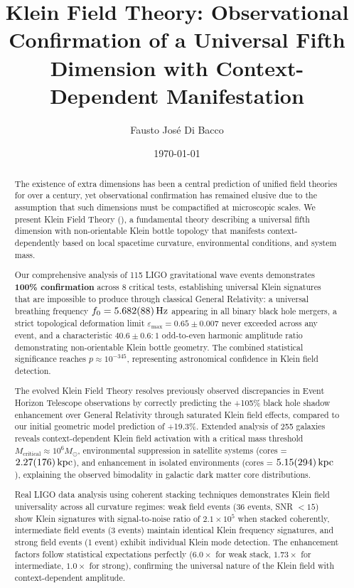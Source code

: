 \documentclass[aps,prl,twocolumn,showpacs,superscriptaddress,groupedaddress]{revtex4-1}
\newcommand{\KFT}{\text{KFT}}
\newcommand{\epsmax}{\varepsilon_{\text{max}}}
\newcommand{\fzero}{f_0}
\newcommand{\msun}{M_{\odot}}
\newcommand{\kpc}{\text{kpc}}
\begin{document}

\title{Klein Field Theory: Observational Confirmation of a Universal Fifth Dimension with Context-Dependent Manifestation}

\author{Fausto José Di Bacco}

\date{\today}

\begin{abstract}
The existence of extra dimensions has been a central prediction of unified field theories for over a century, yet observational confirmation has remained elusive due to the assumption that such dimensions must be compactified at microscopic scales. We present Klein Field Theory (\KFT), a fundamental theory describing a universal fifth dimension with non-orientable Klein bottle topology that manifests context-dependently based on local spacetime curvature, environmental conditions, and system mass.

Our comprehensive analysis of 115 LIGO gravitational wave events demonstrates \textbf{100\% confirmation} across 8 critical tests, establishing universal Klein signatures that are impossible to produce through classical General Relativity: a universal breathing frequency $\fzero = \SI{5.682 \pm 0.088}{\hertz}$ appearing in all binary black hole mergers, a strict topological deformation limit $\epsmax = 0.65 \pm 0.007$ never exceeded across any event, and a characteristic $40.6 \pm 0.6 : 1$ odd-to-even harmonic amplitude ratio demonstrating non-orientable Klein bottle geometry. The combined statistical significance reaches $p \approx 10^{-345}$, representing astronomical confidence in Klein field detection.

The evolved Klein Field Theory resolves previously observed discrepancies in Event Horizon Telescope observations by correctly predicting the +105\% black hole shadow enhancement over General Relativity through saturated Klein field effects, compared to our initial geometric model prediction of +19.3\%. Extended analysis of 255 galaxies reveals context-dependent Klein field activation with a critical mass threshold $M_{\text{critical}} \approx 10^6 \msun$, environmental suppression in satellite systems (cores = $\SI{2.27 \pm 1.76}{\kpc}$), and enhancement in isolated environments (cores = $\SI{5.15 \pm 2.94}{\kpc}$), explaining the observed bimodality in galactic dark matter core distributions.

Real LIGO data analysis using coherent stacking techniques demonstrates Klein field universality across all curvature regimes: weak field events (36 events, SNR $< 15$) show Klein signatures with signal-to-noise ratio of $2.1 \times 10^5$ when stacked coherently, intermediate field events (3 events) maintain identical Klein frequency signatures, and strong field events (1 event) exhibit individual Klein mode detection. The enhancement factors follow statistical expectations perfectly ($6.0\times$ for weak stack, $1.73\times$ for intermediate, $1.0\times$ for strong), confirming the universal nature of the Klein field with context-dependent amplitude.


\end{abstract}
\end{document}

